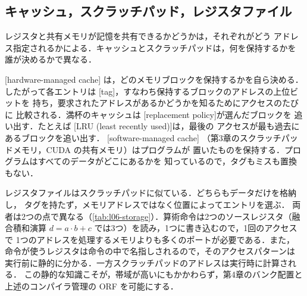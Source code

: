 \documentclass[../main.tex]{subfiles}
\begin{document}
\subsection{キャッシュ，スクラッチパッド，レジスタファイル}

レジスタと共有メモリが記憶を共有できるかどうかは，それぞれがどう
アドレス指定されるかによる．キャッシュとスクラッチパッドは，何を保持するかを
誰が決めるかで異なる．

\begin{definition}[ハードウェア管理キャッシュとソフトウェア管理キャッシュ]
  \label{def:l06-managed-caches}
  [hardware-managed cache]
  は，どのメモリブロックを保持するかを自ら決める．したがって各エントリは
  [tag]，すなわち保持するブロックのアドレスの上位ビットを
  持ち，要求されたアドレスがあるかどうかを知るためにアクセスのたびに
  比較される．満杯のキャッシュは
  [replacement policy]が選んだブロックを
  追い出す．たとえば
  [LRU (least recently used)]は，最後の
  アクセスが最も過去にあるブロックを追い出す．
  [software-managed cache]
  （第3章のスクラッチパッドメモリ，CUDA の共有メモリ）はプログラムが
  置いたものを保持する．プログラムはすべてのデータがどこにあるかを
  知っているので，タグもミスも置換もない．
\end{definition}

レジスタファイルはスクラッチパッドに似ている．どちらもデータだけを格納し，
タグを持たず，メモリアドレスではなく位置によってエントリを選ぶ．
両者は2つの点で異なる（\cref{tab:l06-storage}）．算術命令は2つのソースレジスタ（融合積和演算
$d = a \cdot b + c$ では3つ）を読み，1つに書き込むので，1回のアクセスで
1つのアドレスを処理するメモリよりも多くのポートが必要である．また，
命令が使うレジスタは命令の中で名指しされるので，そのアクセスパターンは
実行前に静的に分かる．一方スクラッチパッドのアドレスは実行時に計算される．
この静的な知識こそが，帯域が高いにもかかわらず，第4章のバンク配置と
上述のコンパイラ管理の ORF を可能にする．
\end{document}

